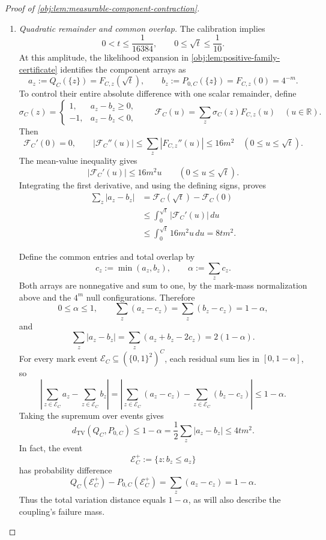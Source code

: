 \begin{proof}[Proof of \cref{obj:lem:measurable-component-contraction}]
\begin{enumerate}
\item \textit{Quadratic remainder and common overlap.}
The calibration implies
\[
0<t\le\frac1{16384},
\qquad
0\le\sqrt t\le\frac1{10}.
\]
At this amplitude, the likelihood expansion in
\cref{obj:lem:positive-family-certificate} identifies the component arrays as
\[
a_z:=Q_C(\{z\})=F_{C,z}(\sqrt t),
\qquad
b_z:=P_{0,C}(\{z\})=F_{C,z}(0)=4^{-m}.
\]
To control their entire absolute difference with one scalar remainder, define
\[
\sigma_C(z)=
\begin{cases}
1,&a_z-b_z\ge0,\\
-1,&a_z-b_z<0,
\end{cases}
\qquad
\mathcal F_C(u)=\sum_z\sigma_C(z)F_{C,z}(u)
\quad(u\in\mathbb R).
\]
Then
\[
\mathcal F_C'(0)=0,
\qquad
|\mathcal F_C''(u)|
\le\sum_z|F_{C,z}''(u)|
\le16m^2
\quad(0\le u\le\sqrt t).
\]
The mean-value inequality gives
\[
|\mathcal F_C'(u)|\le16m^2u
\qquad(0\le u\le\sqrt t).
\]
Integrating the first derivative, and using the defining signs, proves
\[
\begin{aligned}
\sum_z|a_z-b_z|
&=\mathcal F_C(\sqrt t)-\mathcal F_C(0)\\
&\le\int_0^{\sqrt t}|\mathcal F_C'(u)|\,du\\
&\le\int_0^{\sqrt t}16m^2u\,du
=8tm^2.
\end{aligned}
\]

Define the common entries and total overlap by
\[
c_z:=\min(a_z,b_z),
\qquad
\alpha:=\sum_zc_z.
\]
Both arrays are nonnegative and sum to one, by the mark-mass normalization above and the \(4^m\) null configurations. Therefore
\[
0\le\alpha\le1,
\qquad
\sum_z(a_z-c_z)=\sum_z(b_z-c_z)=1-\alpha,
\]
and
\[
\sum_z|a_z-b_z|
=\sum_z(a_z+b_z-2c_z)
=2(1-\alpha).
\]
For every mark event
\(\mathcal E_C\subseteq(\{0,1\}^2)^C\), each residual sum lies in \([0,1-\alpha]\), so
\[
\left|
 \sum_{z\in\mathcal E_C}a_z-\sum_{z\in\mathcal E_C}b_z
\right|
=
\left|
 \sum_{z\in\mathcal E_C}(a_z-c_z)
 -
 \sum_{z\in\mathcal E_C}(b_z-c_z)
\right|
\le1-\alpha.
\]
Taking the supremum over events gives
\[
d_{\mathrm{TV}}(Q_C,P_{0,C})
\le1-\alpha
=\frac12\sum_z|a_z-b_z|
\le4tm^2.
\]
In fact, the event
\[
\mathcal E_C^+:=\{z:b_z\le a_z\}
\]
has probability difference
\[
Q_C(\mathcal E_C^+)-P_{0,C}(\mathcal E_C^+)
=\sum_z(a_z-c_z)=1-\alpha.
\]
Thus the total variation distance equals \(1-\alpha\), as will also describe the coupling's failure mass.


\end{enumerate}
\end{proof}
